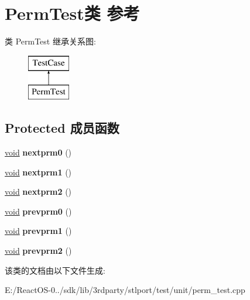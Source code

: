 \hypertarget{class_perm_test}{}\section{Perm\+Test类 参考}
\label{class_perm_test}
类 Perm\+Test 继承关系图\+:\begin{figure}[H]
\begin{center}
\leavevmode
\includegraphics[height=2.000000cm]{class_perm_test}
\end{center}
\end{figure}
\subsection*{Protected 成员函数}
\begin{DoxyCompactItemize}
\item 
\mbox{\label{class_perm_test_afbfb4f051bf6700ab86a595399f8ec28}} 
\hyperlink{interfacevoid}{void} {\bfseries nextprm0} ()
\item 
\mbox{\label{class_perm_test_afac184a6c84cca982f9e2f174d8460c0}} 
\hyperlink{interfacevoid}{void} {\bfseries nextprm1} ()
\item 
\mbox{\label{class_perm_test_aa86da2a40086f8e19e764922326b85cf}} 
\hyperlink{interfacevoid}{void} {\bfseries nextprm2} ()
\item 
\mbox{\label{class_perm_test_adb6144920b518651b2be38c109bfcae4}} 
\hyperlink{interfacevoid}{void} {\bfseries prevprm0} ()
\item 
\mbox{\label{class_perm_test_aaeb2dd0c7558758fc5b8606b50187060}} 
\hyperlink{interfacevoid}{void} {\bfseries prevprm1} ()
\item 
\mbox{\label{class_perm_test_a898169864695643d5619fbe222175632}} 
\hyperlink{interfacevoid}{void} {\bfseries prevprm2} ()
\end{DoxyCompactItemize}


该类的文档由以下文件生成\+:\begin{DoxyCompactItemize}
\item 
E\+:/\+React\+O\+S-\/0../sdk/lib/3rdparty/stlport/test/unit/perm\+\_\+test.\+cpp\end{DoxyCompactItemize}
